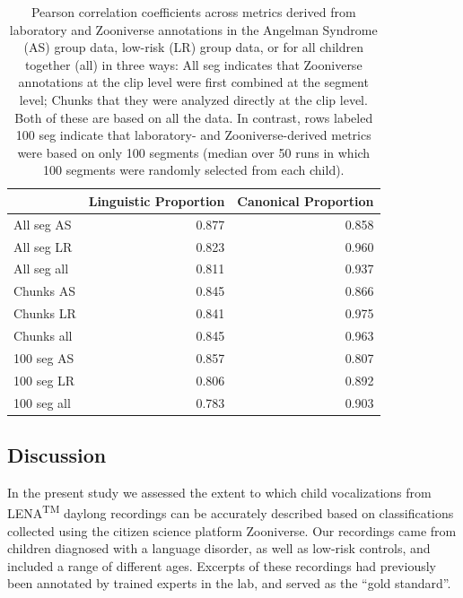 \documentclass[english,,man,floatsintext]{apa6}
\begin{document}
\begin{table}

\caption{\label{tab:tab-cors}Pearson correlation coefficients across metrics derived from laboratory and Zooniverse annotations in the Angelman Syndrome (AS) group data, low-risk (LR) group data, or for all children together (all) in three ways: All seg indicates that Zooniverse annotations at the clip level were first combined at the segment level; Chunks that they were analyzed directly at the clip level. Both of these are based on all the data. In contrast, rows labeled 100 seg indicate that laboratory- and Zooniverse-derived metrics were based on only 100 segments (median over 50 runs in which 100 segments were randomly selected from each child).}
\centering
\begin{tabular}[t]{l|r|r}
\hline
  & Linguistic Proportion & Canonical Proportion\\
\hline
All seg AS & 0.877 & 0.858\\
\hline
All seg LR & 0.823 & 0.960\\
\hline
All seg all & 0.811 & 0.937\\
\hline
Chunks AS & 0.845 & 0.866\\
\hline
Chunks LR & 0.841 & 0.975\\
\hline
Chunks all & 0.845 & 0.963\\
\hline
100 seg AS & 0.857 & 0.807\\
\hline
100 seg LR & 0.806 & 0.892\\
\hline
100 seg all & 0.783 & 0.903\\
\hline
\end{tabular}
\end{table}

\hypertarget{discussion}{%
\subsection{Discussion}\label{discussion}}

In the present study we assessed the extent to which child vocalizations from LENA\textsuperscript{TM} daylong recordings can be accurately described based on classifications collected using the citizen science platform Zooniverse. Our recordings came from children diagnosed with a language disorder, as well as low-risk controls, and included a range of different ages. Excerpts of these recordings had previously been annotated by trained experts in the lab, and served as the \enquote{gold standard}.
\end{document}
